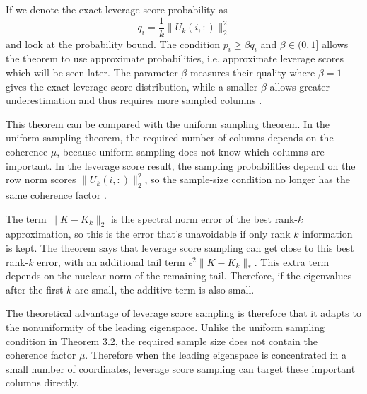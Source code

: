 If we denote the exact leverage score probability as
\[
q_i=\frac{1}{k}\|U_k(i,:)\|_2^2
\] and look at the probability bound. The condition $p_i\geq \beta q_i$ and $\beta\in(0,1]$ allows the theorem to use approximate probabilities, i.e. approximate leverage scores which will be seen later. The parameter $\beta$ measures their quality where $\beta=1$ gives the exact leverage score distribution, while a smaller $\beta$ allows greater underestimation and thus requires more sampled columns \citep{gittens2016revisiting}.

This theorem can be compared with the uniform sampling theorem. In the uniform sampling theorem, the required number of columns depends on the coherence $\mu$, because uniform sampling does not know which columns are important. In the leverage score result, the sampling probabilities depend on the row norm scores $\|U_k(i,:)\|_2^2$, so the sample-size condition no longer has the same coherence factor \citep{gittens2016revisiting}.

The term $\|K-K_k\|_2$ is the spectral norm error of the best rank-$k$ approximation, so this is the error that's unavoidable if only rank $k$ information is kept. The theorem says that leverage score sampling can get close to this best rank-$k$ error, with an additional tail term $\epsilon^2\|K-K_k\|_*.$ This extra term depends on the nuclear norm of the remaining tail. Therefore, if the eigenvalues after the first $k$ are small, the additive term is also small. 

The theoretical advantage of leverage score sampling is therefore that it adapts to the nonuniformity of the leading eigenspace. Unlike the uniform sampling condition in Theorem 3.2, the required sample size does not contain the coherence factor $\mu$. Therefore when the leading eigenspace is concentrated in a small number of coordinates, leverage score sampling can target these important columns directly.